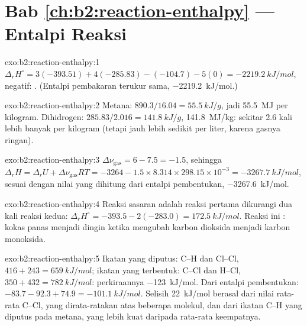 \section*{Bab \ref{ch:b2:reaction-enthalpy} --- Entalpi Reaksi}

\begin{solution}{exo:b2:reaction-enthalpy:1}
$\Delta_r H^\circ = 3(-393.51) + 4(-285.83) - (-104.7) - 5(0) =
\qty{-2219.2}{kJ/mol}$, negatif: . (Entalpi pembakaran terukur
sama, \qty{-2219.2}{kJ/mol}.)
\end{solution}

\begin{solution}{exo:b2:reaction-enthalpy:2}
Metana: $890.3/16.04 = \qty{55.5}{kJ/g}$, jadi \qty{55.5}{MJ} per
kilogram. Dihidrogen: $285.83/2.016 = \qty{141.8}{kJ/g}$,
\qty{141.8}{MJ/kg}: sekitar 2.6 kali lebih banyak per kilogram (tetapi
jauh lebih sedikit per liter, karena gasnya ringan).
\end{solution}

\begin{solution}{exo:b2:reaction-enthalpy:3}
$\Delta\nu_{\text{gas}} = 6 - 7.5 = -1.5$, sehingga $\Delta_r H = \Delta_r U +
\Delta\nu_{\text{gas}}RT = -3264 - 1.5 \times 8.314 \times 298.15 \times
10^{-3} = \qty{-3267.7}{kJ/mol}$, sesuai dengan nilai yang dihitung dari
entalpi pembentukan, \qty{-3267.6}{kJ/mol}.
\end{solution}

\begin{solution}{exo:b2:reaction-enthalpy:4}
Reaksi sasaran adalah reaksi pertama dikurangi dua kali reaksi kedua:
$\Delta_r H^\circ = -393.5 - 2(-283.0) = \qty{+172.5}{kJ/mol}$. Reaksi ini
: kokas panas menjadi dingin ketika mengubah karbon dioksida
menjadi karbon monoksida.
\end{solution}

\begin{solution}{exo:b2:reaction-enthalpy:5}
Ikatan yang diputus: C--H dan Cl--Cl, $416 + 243 = \qty{659}{kJ/mol}$;
ikatan yang terbentuk: C--Cl dan H--Cl, $350 + 432 = \qty{782}{kJ/mol}$:
perkiraannya \qty{-123}{kJ/mol}. Dari entalpi pembentukan:
$-83.7 - 92.3 + 74.9 =
\qty{-101.1}{kJ/mol}$. Selisih \qty{22}{kJ/mol}
berasal dari nilai rata-rata C--Cl, yang dirata-ratakan atas beberapa
molekul, dan dari ikatan C--H yang diputus pada metana, yang lebih kuat
daripada rata-rata keempatnya.
\end{solution}

